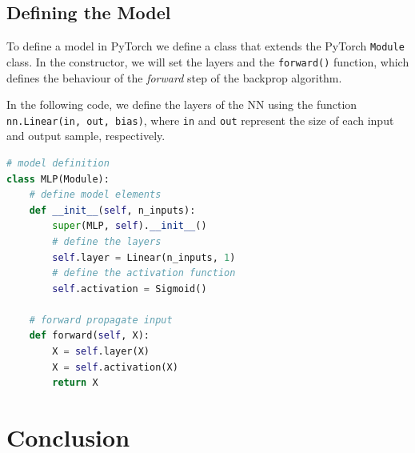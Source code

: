 \documentclass[nobib]{tufte-handout} %
\begin{document}
\subsection{Defining the Model}%
  \label{sub:Defining the Model}
  To define a model in PyTorch we define a class that extends the PyTorch \texttt{Module} class. In the constructor, we will set the layers and the \texttt{forward()} function, which defines the behaviour of the \textit{forward} step of the backprop algorithm.

  In the following code, we define the layers of the NN using the function \texttt{nn.Linear(in, out, bias)}, where \texttt{in} and \texttt{out} represent the size of each input and output sample, respectively. 
\begin{lstlisting}[language=python]
  # model definition
class MLP(Module):
    # define model elements
    def __init__(self, n_inputs):
        super(MLP, self).__init__()
        # define the layers
        self.layer = Linear(n_inputs, 1)
        # define the activation function 
        self.activation = Sigmoid()
 
    # forward propagate input
    def forward(self, X):
        X = self.layer(X)
        X = self.activation(X)
        return X
  \end{lstlisting}
  \section{Conclusion}%
    \label{sec:Conclusion}
     
\newpage
    

  
\end{document}
